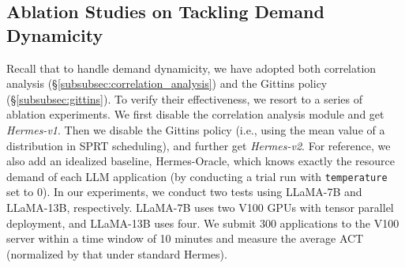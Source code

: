

\subsection{$\!\!$Ablation Studies on Tackling Demand Dynamicity$\!\!$}


Recall that to handle demand dynamicity, we have adopted both correlation analysis (\S\ref{subsubsec:correlation_analysis}) and the Gittins policy (\S\ref{subsubsec:gittins}). 
To verify their effectiveness, we resort to a series of ablation experiments. 
We first disable the correlation analysis module and get \emph{Hermes-v1}.
Then we disable the Gittins policy (i.e., using the mean value of a distribution in SPRT scheduling), and further get \emph{Hermes-v2}. 
For reference, we also add an idealized baseline, Hermes-Oracle, which knows exactly the resource demand of each LLM application (by conducting a trial run with \texttt{temperature} set to 0).
In our experiments, we conduct two tests using LLaMA-7B and LLaMA-13B, respectively. 
LLaMA-7B uses two V100 GPUs with tensor parallel deployment, and LLaMA-13B uses four. 
We submit 300 applications to the V100 server within a time window of 10 minutes and measure the average ACT (normalized by that under standard Hermes).

